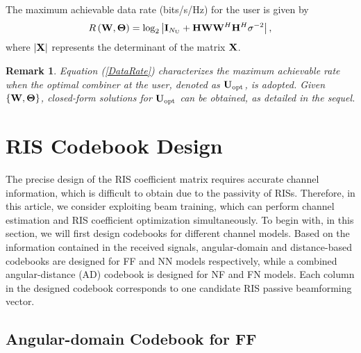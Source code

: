 \documentclass[lettersize, journal]{IEEEtran}
\newtheorem{myRemark}{Remark}
\begin{document}
The maximum achievable data rate (bits/s/Hz) for the user is given by
\begin{equation} \label{DataRate} 
R \left( {\bf{W}}, {\bf{\Theta }} \right) = \log_2 \left| {\bf{I}}_{N_{\rm{U}}} +  {\bf{H}} {\bf{W}} {\bf{W}}^H {\bf{H}}^H  \sigma^{-2} \right|,
\end{equation}
where $\left| {\bf{X}} \right|$ represents the determinant of the matrix ${\bf{X}}$. 

\begin{myRemark} \label{Remark_U}
Equation (\ref{DataRate}) characterizes the maximum achievable rate when the optimal combiner at the user, denoted as ${\bf{U}}_{\rm{opt}}$, is adopted.
Given $\left\{ {\bf{W}}, {\bf{\Theta }}\right\}$, closed-form solutions for ${\bf{U}}_{\rm{opt}}$ can be obtained, as detailed in the sequel.
\end{myRemark}

\section{RIS Codebook Design}

The precise design of the RIS coefficient matrix requires accurate channel information, which is difficult to obtain due to the passivity of RISs.
Therefore, in this article, we consider exploiting beam training, which can perform channel estimation and RIS coefficient optimization simultaneously. 
To begin with, in this section, we will first design codebooks for different channel models.
Based on the information contained in the received signals, angular-domain and distance-based codebooks are designed for FF and NN models respectively, while a combined angular-distance (AD) codebook is designed for NF and FN models.
Each column in the designed codebook corresponds to one candidate RIS passive beamforming vector.

\subsection{ Angular-domain Codebook for FF }
\end{document}
